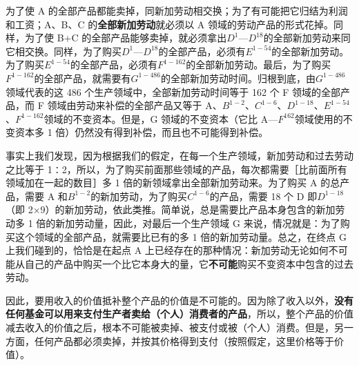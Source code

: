 为了使 A 的全部产品都能卖掉，同新加劳动相交换；为了有可能把它归结为利润和工资；A、B、C 的\textbf{全部新加劳动}就必须以 A 领域的劳动产品的形式花掉。同样，为了使 B+C 的全部产品能够卖掉，就必须拿出$D^{1}$—$D^{18}$的全部新加劳动来同它相交换。同样，为了购买$D^{1}$—$D^{18}$的全部产品，必须有$E^{1-54}$的全部新加劳动。为了购买$E^{1-54}$的全部产品，必须有$F^{1-162}$的全部新加劳动。最后，为了购买$F^{1-162}$的全部产品，就需要有$G^{1-486}$的全部新加劳动时间。归根到底，由$G^{1-486}$领域代表的这 486 个生产领域中，全部新加劳动时间等于 162 个 F 领域的全部产品，而 F 领域由劳动来补偿的全部产品又等于 A、$B^{1-2}$、$C^{1-6}$、$D^{1-18}$、$E^{1-54}$、$F^{1-162}$领域的不变资本。但是，G 领域的不变资本（它比 A—$F^{162}$领域使用的不变资本多 1 倍）仍然没有得到补偿，而且也不可能得到补偿。

事实上我们发现，因为根据我们的假定，在每一个生产领域，新加劳动和过去劳动之比等于 1∶2，所以，为了购买前面那些领域的产品，每次都需要［比前面所有领域加在一起的数目］多 1 倍的新领域拿出全部新加劳动来。为了购买 A 的总产品，需要 A 和$B^{1-2}$的新加劳动，为了购买$C^{1-6}$的产品，需要 18 个 D 即$D^{1-18}$（即 2×9）的新加劳动，依此类推。简单说，总是需要比产品本身包含的新加劳动多 1 倍的新加劳动量，因此，对最后一个生产领域 G 来说，情况就是：为了购买这个领域的全部产品，就需要比已有的多 1 倍的新加劳动量。总之，在终点 G 上我们碰到的，恰恰是在起点 A 上已经存在的那种情况：新加劳动无论如何不可能从自己的产品中购买一个比它本身大的量，它\textbf{不可能}购买不变资本中包含的过去劳动。

因此，要用收入的价值抵补整个产品的价值是不可能的。因为除了收入以外，\textbf{没有任何基金可以用来支付生产者卖给（个人）消费者的产品}，所以，整个产品的价值减去收入的价值之后，根本不可能被卖掉、被支付或被（个人）消费。但是，另一方面，任何产品都必须卖掉，并按其价格得到支付（按照假定，这里价格等于价值）。

